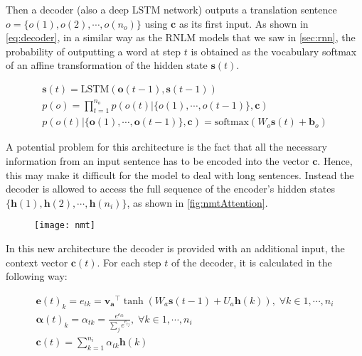 Then a decoder (also a deep LSTM network) outputs a translation sentence $o=\{o(1), o(2), \cdots, o(n_o)\}$ using $\mathbf{c}$ as its first input. As shown in \autoref{eq:decoder}, in a similar way as the RNLM models that we saw in \autoref{sec:rnn}, the probability of outputting a word at step $t$ is obtained as the vocabulary softmax of an affine transformation of the hidden state $\mathbf{s}(t)$.

\begin{equation} \label{eq:decoder}
	\begin{gathered}
		\mathbf{s}(t) = \text{LSTM}(\mathbf{o}(t-1), \mathbf{s}(t-1)) \\
		p(o) = \prod_{t=1}^{n_o} p(o(t)|\{o(1), \cdots, o(t-1)\}, \mathbf{c}) \\
		p(o(t)|\{\mathbf{o}(1), \cdots, \mathbf{o}(t-1)\}, \mathbf{c}) = \text{softmax}(W_o \mathbf{s}(t) +\textbf{b}_o)
	\end{gathered}
\end{equation}

A potential problem for this architecture is the fact that all the necessary information from an input sentence has to be encoded into the vector $\mathbf{c}$. Hence, this may make it difficult for the model to deal with long sentences. Instead the decoder is allowed to access the full sequence of the encoder's hidden states $\{\mathbf{h}(1), \mathbf{h}(2), \cdots, \mathbf{h}(n_i)\}$, as shown in \autoref{fig:nmtAttention}.

\begin{figure}[H]
	\centering
	\texttt{[image: nmt]}
	\label{fig:nmtAttention}
\end{figure}

In this new architecture the decoder is provided with an additional input, the context vector $\mathbf{c}(t)$. For each step $t$ of the decoder, it is calculated in the following way:

\begin{equation} \label{eq:nmtAttention}
	\begin{gathered}
		\mathbf{e}(t)_k = e_{tk} = \mathbf{v_a}^{\top} \tanh(W_a \mathbf{s}(t-1)+U_a\mathbf{h}(k)), \; \forall k \in 1, \cdots , n_i  \\
		\boldsymbol{\alpha}(t)_k = \alpha_{tk} = \frac{e^{e_{tk}}}{\sum_{j}e^{e_{tj}}}, \; \forall k \in 1, \cdots , n_i  \\
		\mathbf{c}(t) = \sum_{k=1}^{n_i} \alpha_{tk} \mathbf{h}(k)
	\end{gathered}
\end{equation}


